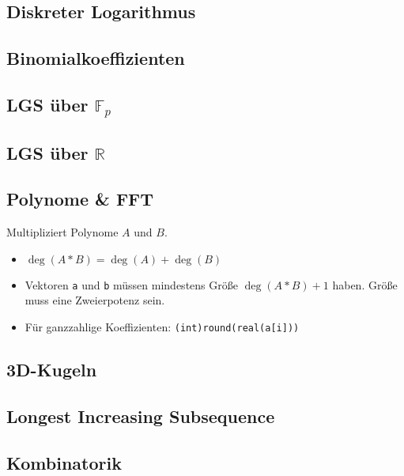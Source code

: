 \subsection{Diskreter Logarithmus}


\subsection{Binomialkoeffizienten}


\subsection{LGS über $\mathbb{F}_p$}


\subsection{LGS über $\mathbb{R}$}


\subsection{Polynome \& FFT}
Multipliziert Polynome $A$ und $B$.
\begin{itemize}[nosep]
	\item $\deg(A * B) = \deg(A) + \deg(B)$
	\item Vektoren \lstinline{a} und \lstinline{b} müssen mindestens Größe
	$\deg(A * B) + 1$ haben.
	Größe muss eine Zweierpotenz sein.
	\item Für ganzzahlige Koeffizienten: \lstinline{(int)round(real(a[i]))}
\end{itemize}


\subsection{3D-Kugeln}


\subsection{Longest Increasing Subsequence}


\subsection{Kombinatorik}

